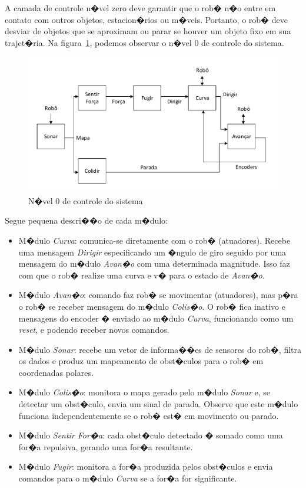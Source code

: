A camada de controle n�vel zero deve garantir que o rob� n�o entre em contato
com outros objetos, estacion�rios ou m�veis. Portanto, o rob� deve desviar de
objetos que se aproximam ou parar se houver um objeto fixo em sua trajet�ria.
Na figura~\ref{BROOKS_3}, podemos observar o n�vel 0 de controle do sistema.

\begin{figure}[H]
\centering
\includegraphics[width=1\columnwidth]{figs/BROOKS_3.pdf}
\caption{N�vel 0 de controle do sistema}
\label{BROOKS_3}
\end{figure}

Segue pequena descri��o de cada m�dulo:
\begin{itemize}
  \item M�dulo \emph{Curva}: comunica-se diretamente com o rob� (atuadores).
  Recebe uma mensagem \emph{Dirigir} especificando um �ngulo de giro seguido por
  uma mensagem do m�dulo \emph{Avan�o} com uma determinada magnitude. Isso faz
  com que o rob� realize uma curva e v� para o estado de \emph{Avan�o}.
  \item M�dulo \emph{Avan�o}: comando faz rob� se movimentar (atuadores), mas
  p�ra o rob� se receber mensagem do m�dulo \emph{Colis�o}. O rob� fica inativo
  e mensagens do encoder � enviado ao m�dulo \emph{Curva}, funcionando como um
  \emph{reset}, e podendo receber novos comandos.
  \item M�dulo \emph{Sonar}: recebe um vetor de informa��es de sensores do rob�,
  filtra os dados e produz um mapeamento de obst�culos para o rob� em
  coordenadas polares.
  \item M�dulo \emph{Colis�o}: monitora o mapa gerado pelo m�dulo \emph{Sonar}
  e, se detectar um obst�culo, envia um sinal de parada. Observe que este m�dulo
  funciona independentemente se o rob� est� em movimento ou parado.
  \item M�dulo \emph{Sentir For�a}: cada obst�culo detectado � somado
  como uma for�a repulsiva, gerando uma for�a resultante.
  \item M�dulo \emph{Fugir}: monitora a for�a produzida pelos obst�culos e envia
  comandos para o m�dulo \emph{Curva} se a for�a for significante.
\end{itemize}
 
